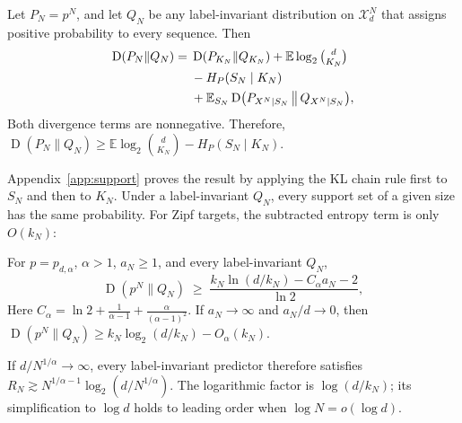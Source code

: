 \documentclass[anon]{alt2027}
\newcommand{\Xd}{\mathcal{X}_d}
\newcommand{\E}{\mathbb{E}}
\newcommand{\KL}{\operatorname{D}}
\begin{document}
\begin{theorem}
\label{thm:support}
Let $P_N=p^N$, and let $Q_N$ be any label-invariant distribution on $\Xd^N$ that assigns positive probability to every sequence. Then
\begin{align}
\label{eq:support}
\KL(P_N\|Q_N)={}&\KL(P_{K_N}\|Q_{K_N})+\E\log_2\tbinom{d}{K_N}\nonumber\\
&-H_P(S_N\mid K_N)\nonumber\\
&+\E_{S_N}\KL\bigl(P_{X^N\mid S_N}\,\big\|\,Q_{X^N\mid S_N}\bigr),
\end{align}
Both divergence terms are nonnegative. Therefore, $\KL(P_N\|Q_N)\ge\E\log_2\binom{d}{K_N}-H_P(S_N\mid K_N)$.
\end{theorem}
Appendix~\ref{app:support} proves the result by applying the KL chain rule first to $S_N$ and then to $K_N$. Under a label-invariant $Q_N$, every support set of a given size has the same probability. For Zipf targets, the subtracted entropy term is only $O(k_N)$:
\begin{corollary}
\label{cor:zipf}
For $p=p_{d,\alpha}$, $\alpha>1$, $a_N\ge1$, and every label-invariant $Q_N$,
\begin{equation}
\label{eq:zipflb}
\KL(p^N\|Q_N)\;\ge\;\frac{k_N\ln(d/k_N)-C_\alpha a_N-2}{\ln 2},
\end{equation}
Here $C_\alpha=\ln2+\frac{1}{\alpha-1}+\frac{\alpha}{(\alpha-1)^2}$. If $a_N\to\infty$ and $a_N/d\to0$, then $\KL(p^N\|Q_N)\ge k_N\log_2(d/k_N)-O_\alpha(k_N)$.
\end{corollary}
If $d/N^{1/\alpha}\to\infty$, every label-invariant predictor therefore satisfies $R_N\gtrsim N^{1/\alpha-1}\log_2(d/N^{1/\alpha})$. The logarithmic factor is $\log(d/k_N)$; its simplification to $\log d$ holds to leading order when $\log N=o(\log d)$.
\end{document}
